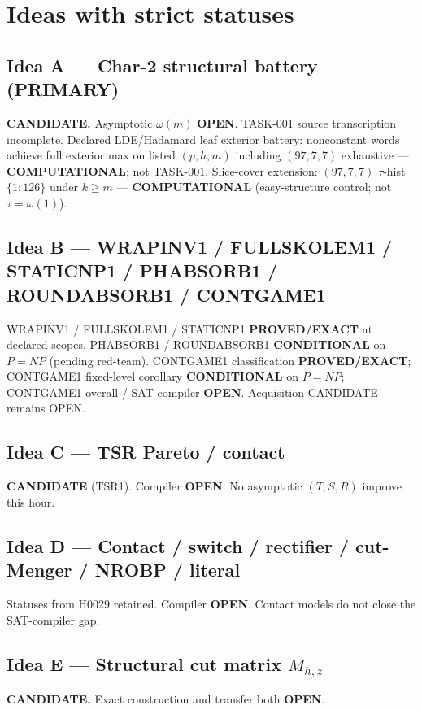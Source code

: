 \documentclass[11pt]{article}
\begin{document}
\section*{Ideas with strict statuses}
\subsection*{Idea A --- Char-2 structural battery (PRIMARY)}
\textbf{CANDIDATE.} Asymptotic $\omega(m)$ \textbf{OPEN}. TASK-001 source transcription incomplete.
Declared LDE/Hadamard leaf exterior battery: nonconstant words achieve full exterior max on
listed $(p,h,m)$ including $(97,7,7)$ exhaustive --- \textbf{COMPUTATIONAL}; not TASK-001.
Slice-cover extension: $(97,7,7)$ $\tau$-hist $\{1{:}126\}$ under $k{\ge}m$ ---
\textbf{COMPUTATIONAL} (easy-structure control; not $\tau=\omega(1)$).

\subsection*{Idea B --- WRAPINV1 / FULLSKOLEM1 / STATICNP1 / PHABSORB1 / ROUNDABSORB1 / CONTGAME1}
WRAPINV1 / FULLSKOLEM1 / STATICNP1 \textbf{PROVED/EXACT} at declared scopes.
PHABSORB1 / ROUNDABSORB1 \textbf{CONDITIONAL} on $P=NP$ (pending red-team).
CONTGAME1 classification \textbf{PROVED/EXACT}; CONTGAME1 fixed-level corollary
\textbf{CONDITIONAL} on $P=NP$; CONTGAME1 overall / SAT-compiler \textbf{OPEN}.
Acquisition CANDIDATE remains OPEN.

\subsection*{Idea C --- TSR Pareto / contact}
\textbf{CANDIDATE} (TSR1). Compiler \textbf{OPEN}. No asymptotic $(T,S,R)$ improve this hour.

\subsection*{Idea D --- Contact / switch / rectifier / cut-Menger / NROBP / literal}
Statuses from H0029 retained. Compiler \textbf{OPEN}. Contact models do not close the SAT-compiler gap.

\subsection*{Idea E --- Structural cut matrix $M_{h,z}$}
\textbf{CANDIDATE.} Exact construction and transfer both \textbf{OPEN}.
\end{document}
